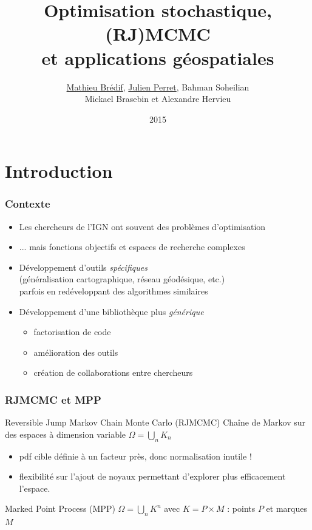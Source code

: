 \documentclass{beamer}
\title{Optimisation stochastique, (RJ)MCMC\\ et applications g\'eospatiales}
\author{\underline{Mathieu Brédif}, \underline{Julien Perret}, Bahman Soheilian\\Mickael Brasebin et Alexandre Hervieu}
\institute{IGN}
\date{2015}
\begin{document}
\frame{\titlepage}
 
 
\section{Introduction}

\begin{frame}
\frametitle{Contexte}
\begin{itemize}
\item Les chercheurs de l'IGN ont souvent des probl\`emes d'optimisation\\
\item ... mais fonctions objectifs et espaces de recherche complexes
\item D\'eveloppement d'outils \emph{sp\'ecifiques}\\
(g\'en\'eralisation cartographique, r\'eseau g\'eod\'esique, etc.)\\
parfois en redéveloppant des algorithmes similaires
\item D\'eveloppement d'une biblioth\`eque plus \emph{g\'en\'erique}
\begin{itemize}
\item factorisation de code
\item am\'elioration des outils
\item cr\'eation de collaborations entre chercheurs
\end{itemize}
\end{itemize}
\end{frame}


\begin{frame}
\frametitle{RJMCMC et MPP}
\begin{block}{Reversible Jump Markov Chain Monte Carlo (RJMCMC)}
Chaîne de Markov sur des espaces à dimension variable $\Omega=\bigcup_n K_n$
\begin{itemize}
\item pdf cible définie à un facteur près, donc normalisation inutile !
\item flexibilité sur l'ajout de noyaux permettant d'explorer plus efficacement l'espace.
\end{itemize}
\end{block}

\begin{block}{Marked Point Process (MPP)}
$\Omega=\bigcup_n K^n$ avec $K=P\times M$ : points $P$ et marques $M$
\end{block}
\end{frame}
\end{document}
